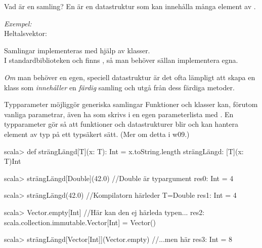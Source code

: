 

\begin{Slide}{Vad är en samling?}
En   är en datastruktur som kan innehålla många element av .

\pause 
\vspace{2em}\emph{Exempel:} \\Heltalsvektor: \hfill{}

\pause 
{\SlideFontSmall\vspace{2em}Samlingar implementeras med hjälp av klasser. \\ I standardbiblioteken  och  finns  , så man behöver sällan implementera egna. 

\pause\vspace{0.5em}\emph{Om} man behöver en egen, speciell datastruktur är det ofta lämpligt att skapa en klass som \emph{innehåller} en \emph{färdig} samling och utgå från dess färdiga metoder.

}

\end{Slide}


\begin{Slide}{Typparameter möjliggör generiska samlingar}\SlideFontSmall
Funktioner och klasser kan, förutom vanliga parametrar, även ha  som skrivs i en egen parameterlista med . En typparameter gör så att funktioner och datastrukturer blir  och kan hantera element av  typ på ett typsäkert sätt. (Mer om detta i w09.)

\begin{REPLnonum}
scala> def strängLängd[T](x: T): Int = x.toString.length
strängLängd: [T](x: T)Int

scala> strängLängd[Double](42.0)  //Double är typargument
res0: Int = 4

scala> strängLängd(42.0) //Kompilatorn härleder T=Double
res1: Int = 4

scala> Vector.empty[Int] //Här kan den ej härleda typen...
res2: scala.collection.immutable.Vector[Int] = Vector()

scala> strängLängd[Vector[Int]](Vector.empty) //...men här
res3: Int = 8
\end{REPLnonum}
\end{Slide}

